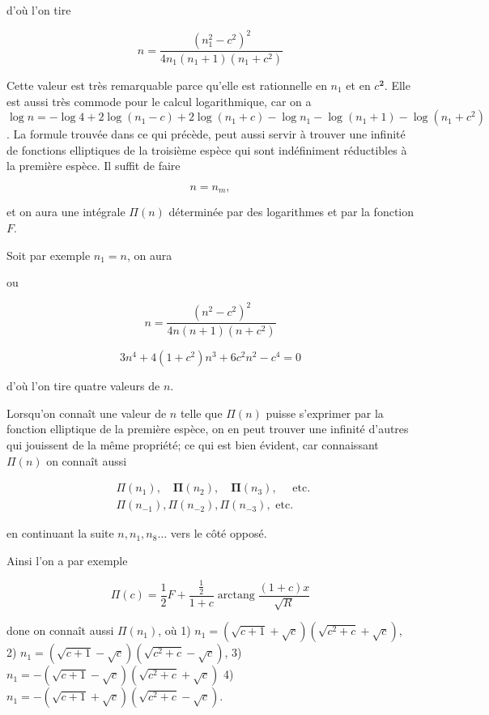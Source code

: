 \documentclass{article}
\begin{document}
d'où l'on tire

\[
n=\frac{\left(n_{1}^{2}-c^{2}\right)^{2}}{4 n_{1}\left(n_{1}+1\right)\left(n_{1}+c^{2}\right)}
\]

Cette valeur est très remarquable parce qu'elle est rationnelle en \(n_{1}\) et en \(c^{\mathbf{2}}\). Elle est aussi très commode pour le calcul logarithmique, car on a \(\log n=-\log 4+2 \log \left(n_{1}-c\right)+2 \log \left(n_{1}+c\right)-\log n_{1}-\log \left(n_{1}+1\right)-\log \left(n_{1}+c^{2}\right)\). La formule trouvée dans ce qui précède, peut aussi servir à trouver une infinité de fonctions elliptiques de la troisième espèce qui sont indéfiniment réductibles à la première espèce. Il suffit de faire

\[
n=n_{m},
\]

et on aura une intégrale \(\Pi(n)\) déterminée par des logarithmes et par la fonction \(F\).

Soit par exemple \(n_{1}=n\), on aura

ou

\[
n=\frac{\left(n^{2}-c^{2}\right)^{2}}{4 n(n+1)\left(n+c^{2}\right)}
\]

\[
3 n^{4}+4\left(1+c^{2}\right) n^{3}+6 c^{2} n^{2}-c^{4}=0
\]

d'où l'on tire quatre valeurs de \(n\).

Lorsqu'on connaît une valeur de \(n\) telle que \(\Pi(n)\) puisse s'exprimer par la fonction elliptique de la première espèce, on en peut trouver une infinité d'autres qui jouissent de la même propriété; ce qui est bien évident, car connaissant \(\Pi(n)\) on connaît aussi

\[
\begin{aligned}
& \Pi\left(n_{1}\right), \quad \boldsymbol{\Pi}\left(n_{2}\right), \quad \boldsymbol{\Pi}\left(n_{3}\right), \quad \text { etc. } \\
& \Pi\left(n_{-1}\right), \Pi\left(n_{-2}\right), \Pi\left(n_{-3}\right), \text { etc. }
\end{aligned}
\]

en continuant la suite \(n, n_{1}, n_{8} \ldots\) vers le côté opposé.

Ainsi l'on a par exemple

\[
\Pi(c)=\frac{1}{2} F+\frac{\frac{1}{2}}{1+c} \operatorname{arctang} \frac{(1+c) x}{\sqrt{R}}
\]

done on connaît aussi \(\Pi\left(n_{1}\right)\), où
1) \(n_{1}=(\sqrt{c+1}+\sqrt{c})\left(\sqrt{c^{2}+c}+\sqrt{c}\right)\),
2) \(n_{1}=(\sqrt{c+1}-\sqrt{c})\left(\sqrt{c^{2}+c}-\sqrt{c}\right)\),
3) \(n_{1}=-(\sqrt{c+1}-\sqrt{c})\left(\sqrt{c^{2}+c}+\sqrt{c}\right)\)
4) \(n_{1}=-(\sqrt{c+1}+\sqrt{c})\left(\sqrt{c^{2}+c}-\sqrt{c}\right)\).
\end{document}
